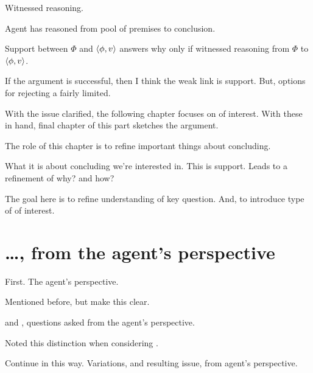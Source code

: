\begin{note}[\qHow{}]
  Witnessed reasoning.

  Agent has reasoned from pool of premises to conclusion.
\end{note}

\begin{note}[Combined]
  Support between \(\Phi\) and \(\langle \phi, v \rangle\) answers why only if witnessed reasoning from \(\Phi\) to \(\langle \phi, v \rangle\).
\end{note}

\begin{note}
  If the argument is successful, then I think the weak link is support.
  But, options for rejecting a fairly limited.
\end{note}

\begin{note}
  With the issue clarified, the following chapter focuses on  of interest.
  With these in hand, final chapter of this part sketches the argument.
\end{note}


\begin{note}
  The role of this chapter is to refine important things about concluding.

  What it is about concluding we're interested in.
  This is support.
  Leads to a refinement of why? and how?
\end{note}

\begin{note}
  The goal here is to refine understanding of key question.
  And, to introduce type of \scen{} of interest.
\end{note}

\section{\dots, from the agent's perspective}
\label{cha:introduction:sec:agents-perspective}

\begin{note}
  First.
  The agent's perspective.

  Mentioned before, but make this clear.
\end{note}

\begin{note}
  \qWhy{} and \qHow{}, questions asked from the agent's perspective.

  Noted this distinction when considering \citeauthor{Davidson:1963aa}.

  Continue in this way.
  Variations, and resulting issue, from agent's perspective.
\end{note}

